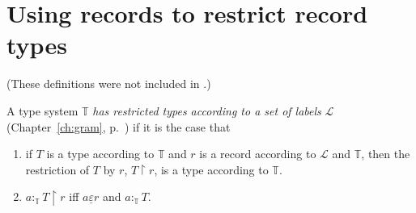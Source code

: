 


\section{Using records to restrict %
  record types}
\label{app:specrec}

(These definitions were not included in \citealp{Cooper2012}.)


  A type system $\mathbb{T}$ \textit{has restricted types according to a
  set of labels} $\mathcal{L}$ (Chapter~\ref{ch:gram},
p.~\pageref{pg:typerestriction}) if it is the case that
\begin{enumerate} 
 
\item   if  $T$ is a type according to $\mathbb{T}$ and
  $r$ is a record according to $\mathcal{L}$ and $\mathbb{T}$, then the
  restriction of $T$ by $r$, $T\!\restriction\!r$, is a
type according to $\mathbb{T}$.
 
\item $a:_{\mathbb{T}}T\!\restriction\!r$ iff $a\underline{\varepsilon} r$  and $a:_{\mathbb{T}}T$. 
 
\end{enumerate}

